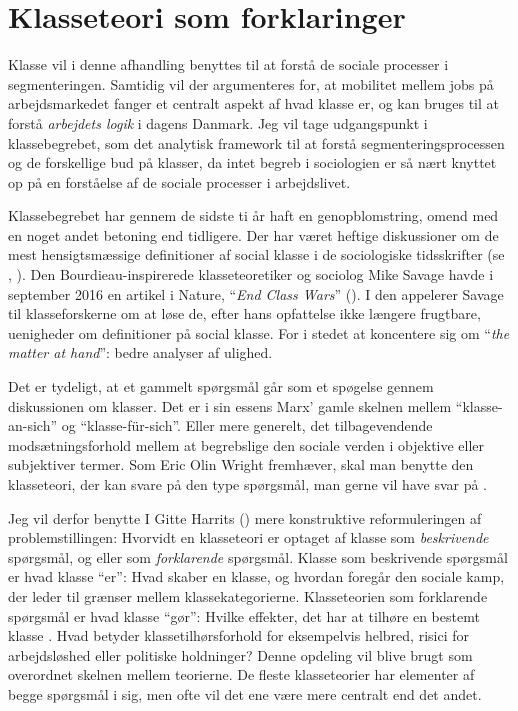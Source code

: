 
\chapter{Klasseteori som forklaringer \label{kapitel_teori_klasse}}

Klasse vil i denne afhandling benyttes til at forstå de sociale processer i segmenteringen. Samtidig vil der argumenteres for, at mobilitet mellem jobs på arbejdsmarkedet fanger et centralt aspekt af hvad klasse er, og kan bruges til at forstå \emph{arbejdets logik} i dagens Danmark. Jeg vil tage udgangspunkt i klassebegrebet, som det analytisk framework til at forstå segmenteringsprocessen  og de forskellige bud på klasser, da intet begreb i sociologien er så nært knyttet op på en forståelse af de sociale processer i arbejdslivet. 

Klassebegrebet har gennem de sidste ti år haft en genopblomstring, omend med en noget andet betoning end tidligere. %
Der har været heftige diskussioner om de mest hensigtsmæssige definitioner af social klasse i de sociologiske tidsskrifter (se \cite{Grusky2001}, \cite{Goldthorpe2002}). Den Bourdieau-inspirerede klasseteoretiker og sociolog Mike Savage havde i september 2016 en artikel i Nature, “\emph{End Class Wars}” (\citeyear{Savage2016}). I den appelerer Savage til klasseforskerne om at løse de, efter hans opfattelse ikke længere frugtbare, uenigheder om definitioner på social klasse. For i stedet at koncentere sig om “\emph{the matter at hand}”: bedre analyser af ulighed. 

Det er tydeligt, at et gammelt spørgsmål går som et spøgelse gennem diskussionen om klasser. Det er i sin essens Marx' gamle skelnen mellem  “klasse-an-sich” og “klasse-für-sich”. Eller mere generelt, det tilbagevendende modsætningsforhold mellem at begrebslige den sociale verden i objektive eller subjektiver termer. Som Eric Olin Wright fremhæver, skal man benytte den klasseteori, der kan svare på den type spørgsmål, man gerne vil have svar på \parencite[330]{Lareau2008}.

Jeg vil derfor benytte I Gitte Harrits (\citeyear{Harrits2014})  mere konstruktive reformuleringen af problemstillingen: Hvorvidt en klasseteori er optaget af klasse som \emph{beskrivende} spørgsmål, og eller som \emph{forklarende} spørgsmål. Klasse som beskrivende spørgsmål er hvad klasse “er”: Hvad skaber en klasse, og hvordan foregår den sociale kamp, der leder til grænser mellem klassekategorierne. Klasseteorien som forklarende spørgsmål er hvad klasse “gør”: Hvilke effekter, det har at tilhøre en bestemt klasse \parencite[19]{Harrits2014}. Hvad betyder klassetilhørsforhold for eksempelvis helbred, risici for arbejdsløshed eller politiske holdninger? Denne opdeling vil blive brugt som overordnet skelnen mellem teorierne. De fleste klasseteorier har elementer af begge spørgsmål i sig, men ofte vil det ene være mere centralt end det andet.

